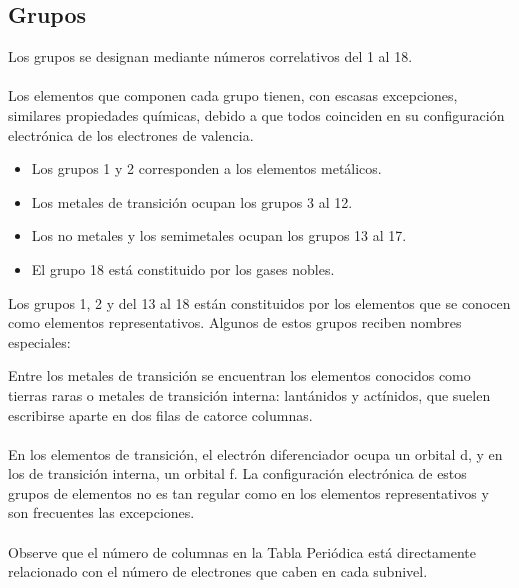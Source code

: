 \documentclass[12pt]{article}
\begin{document}
               \subsection{Grupos}\label{sec:Grupos}
                    Los grupos se designan mediante números correlativos del 1 al 18.\\\\
                    Los elementos que componen cada grupo tienen, con escasas excepciones, similares propiedades químicas, debido a que todos coinciden en su configuración electrónica de los electrones de valencia.

                    \begin{itemize}
                         \item Los grupos 1 y 2 corresponden a los elementos metálicos.
                         \item Los metales de transición ocupan los grupos 3 al 12.
                         \item Los no metales y los semimetales ocupan los grupos 13 al 17.
                         \item El grupo 18 está constituido por los gases nobles.
                    \end{itemize}

                    Los grupos 1, 2 y del 13 al 18 están constituidos por los elementos que se conocen como elementos representativos. Algunos de estos grupos reciben nombres especiales:

                    \begin{table}[H]
                         \centering
                         \begin{adjustbox}{max width=\textwidth}
                         \end{adjustbox}
                         \label{tab:1}
                    \end{table}

                    Entre los metales de transición se encuentran los elementos conocidos como tierras raras o metales de transición interna: lantánidos y actínidos, que suelen escribirse aparte en dos filas de catorce columnas.\\\\
                    En los elementos de transición, el electrón diferenciador ocupa un orbital d, y en los de transición interna, un orbital f. La configuración electrónica de estos grupos de elementos no es tan regular como en los elementos representativos y son frecuentes las excepciones.\\\\
                    Observe que el número de columnas en la Tabla Periódica está directamente relacionado con el número de electrones que caben en cada subnivel.
                    
\end{document}
